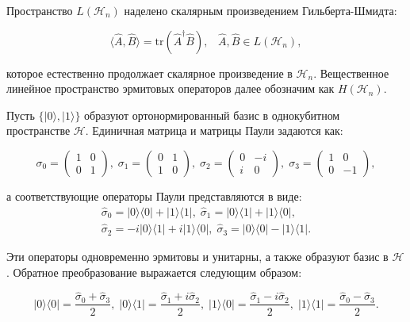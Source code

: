 \documentclass[a4paper]{report}
\begin{document}
Пространство ${L(\mathcal{H}_n)}$ наделено скалярным произведением Гильберта-Шмидта:

\begin{equation}\label{eq1}
    \langle\hat{A},\hat{B}\rangle = \mathrm{tr}(\hat{A}^\dagger\hat{B}),\;\;\;
    \hat{A},\hat{B} \in L(\mathcal{H}_n),
\end{equation}

\noindent которое естественно продолжает скалярное произведение в ${\mathcal{H}_n}$. Вещественное линейное пространство эрмитовых операторов далее обозначим как ${H(\mathcal{H}_n)}$.


Пусть ${\{|0\rangle,|1\rangle\}}$ образуют ортонормированный базис в однокубитном пространстве ${\mathcal{H}}$. Единичная матрица и матрицы Паули задаются как:

$${
    \sigma_0 = \begin{pmatrix}1 & 0 \\ 0 & 1\end{pmatrix},\;
    \sigma_1 = \begin{pmatrix}0 & 1 \\ 1 & 0\end{pmatrix},\;
    \sigma_2 = \begin{pmatrix}0 & -i \\ i & 0\end{pmatrix},\;
    \sigma_3 = \begin{pmatrix}1 & 0 \\ 0 & -1\end{pmatrix},
}$$

\noindent а соответствующие операторы Паули представляются в виде:
\begin{align*}
    \hat{\sigma}_0 = |0\rangle\langle0| + |1\rangle\langle1|,\;
    \hat{\sigma}_1 = |0\rangle\langle1| + |1\rangle\langle0|,     \\
    \hat{\sigma}_2 = -i|0\rangle\langle1| + i|1\rangle\langle0|,\;
    \hat{\sigma}_3 = |0\rangle\langle0| - |1\rangle\langle1|.
\end{align*}

\noindent Эти операторы одновременно эрмитовы и унитарны, а также образуют базис в ${\mathcal{H}}$. Обратное преобразование выражается следующим образом:

$${
    |0\rangle\langle0| = \frac{\hat{\sigma}_0 + \hat{\sigma}_3}{2},\;
    |0\rangle\langle1| = \frac{\hat{\sigma}_1 + i\hat{\sigma}_2}{2},\;
    |1\rangle\langle0| = \frac{\hat{\sigma}_1 - i\hat{\sigma}_2}{2},\;
    |1\rangle\langle1| = \frac{\hat{\sigma}_0 - \hat{\sigma}_3}{2}.
}$$
\end{document}
